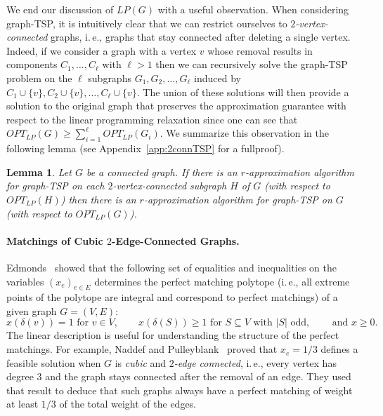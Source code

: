 \documentclass[letterpaper,11pt]{article}
\newtheorem{lemma}[theorem]{Lemma}
\newcommand{\LP}[1]{\ensuremath{LP(#1)}}
\newcommand{\OLP}[1]{\ensuremath{OPT_{LP}(#1)}}
\newcommand{\TSP}{graph-TSP\xspace}
\begin{document}
    We end our discussion of \LP{G} with a useful observation. When
    considering \TSP{}, it is intuitively clear that we can restrict
    ourselves to \emph{$2$-vertex-connected} graphs, i.\,e., graphs that
    stay connected after deleting a single vertex. Indeed, if we consider
    a graph with a vertex $v$ whose removal results in components $C_1,
    \ldots, C_\ell$ with $\ell >1$ then we can recursively solve the
    \TSP{} problem on the $\ell$ subgraphs $G_1, G_2, \dots, G_\ell$
    induced by $C_1 \cup \{v\}, C_2 \cup \{v\}, \dots, C_\ell \cup
    \{v\}$. The union of these solutions will then provide a solution to
    the original graph that preserves the approximation guarantee with
    respect to the linear programming relaxation since one can see that
    $\OLP{G} \geq \sum_{i=1}^\ell \OLP{G_i}$. We summarize this
    observation in the following lemma (see Appendix~\ref{app:2connTSP}
    for a fullproof).
    \begin{lemma}
    \label{lemma:2connTSP}
      Let $G$ be a connected graph. If there is an $r$-approximation
      algorithm for \TSP{} on each $2$-vertex-connected subgraph $H$ of $G$ (with
      respect to \OLP{H}) then there is an $r$-approximation algorithm for \TSP on 
      $G$ (with respect to \OLP{G}).
    \end{lemma}

    \vspace{-0.4cm}
\paragraph{Matchings of Cubic $2$-Edge-Connected Graphs.}
    Edmonds~\cite{Edmonds1965b} showed that the following set of
    equalities and inequalities on the variables $(x_e)_{e\in E}$
    determines the perfect matching polytope (i.\,e.,  all extreme points of the polytope are integral and correspond to perfect matchings)
    of a given graph $G=(V, E)$:
    $$
      x(\delta(v))  = 1 \mbox{ for } v\in V,\qquad
      x(\delta(S))  \geq 1 \mbox{ for } S \subseteq V\mbox{ with $|S|$ odd,}\qquad \mbox{ and } 
      x  \geq 0.
    $$
    The linear description is useful for understanding the structure of
    the perfect matchings. For example, Naddef and Pulleyblank~\cite{NP81}
    proved that $x_e = 1/3$ defines a feasible solution when $G$ is
    \emph{cubic} and \emph{$2$-edge connected}, i.\,e., every vertex has
    degree $3$ and the graph stays connected after the removal of an
    edge. They used that result to deduce that such graphs always have a
    perfect matching of weight at least $1/3$ of the total weight of the
    edges.
\end{document}
